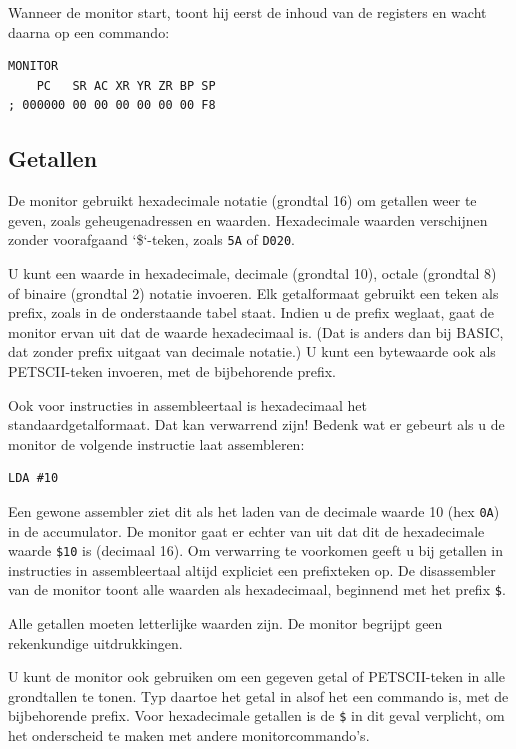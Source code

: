 Wanneer de monitor start, toont hij eerst de inhoud van de registers en wacht daarna op een commando:

\begin{tcolorbox}[colback=blue,coltext=white]
\verbatimfont{\codefont}
\begin{verbatim}
MONITOR
    PC   SR AC XR YR ZR BP SP
; 000000 00 00 00 00 00 00 F8
\end{verbatim}
\end{tcolorbox}

\subsection{Getallen}
\label{sec:numbers}

De monitor gebruikt hexadecimale notatie (grondtal 16) om getallen weer te geven, zoals geheugenadressen en waarden. Hexadecimale waarden verschijnen zonder voorafgaand `\$`-teken, zoals {\tt 5A} of {\tt D020}.

U kunt een waarde in hexadecimale, decimale (grondtal 10), octale (grondtal 8) of binaire (grondtal 2) notatie invoeren. Elk getalformaat gebruikt een teken als prefix, zoals in de onderstaande tabel staat. Indien u de prefix weglaat, gaat de monitor ervan uit dat de waarde hexadecimaal is. (Dat is anders dan bij BASIC, dat zonder prefix uitgaat van decimale notatie.) U kunt een bytewaarde ook als PETSCII-teken invoeren, met de bijbehorende prefix.

Ook voor instructies in assembleertaal is hexadecimaal het standaardgetalformaat. Dat kan verwarrend zijn! Bedenk wat er gebeurt als u de monitor de volgende instructie laat assembleren:

\begin{verbatim}
LDA #10
\end{verbatim}

Een gewone assembler ziet dit als het laden van de decimale waarde 10 (hex {\tt 0A}) in de accumulator. De monitor gaat er echter van uit dat dit de hexadecimale waarde {\tt \$10} is (decimaal 16). Om verwarring te voorkomen geeft u bij getallen in instructies in assembleertaal altijd expliciet een prefixteken op. De disassembler van de monitor toont alle waarden als hexadecimaal, beginnend met het prefix {\tt \$}.

Alle getallen moeten letterlijke waarden zijn. De monitor begrijpt geen rekenkundige uitdrukkingen.

U kunt de monitor ook gebruiken om een gegeven getal of PETSCII-teken in alle grondtallen te tonen. Typ daartoe het getal in alsof het een commando is, met de bijbehorende prefix. Voor hexadecimale getallen is de {\tt \$} in dit geval verplicht, om het onderscheid te maken met andere monitorcommando's.

